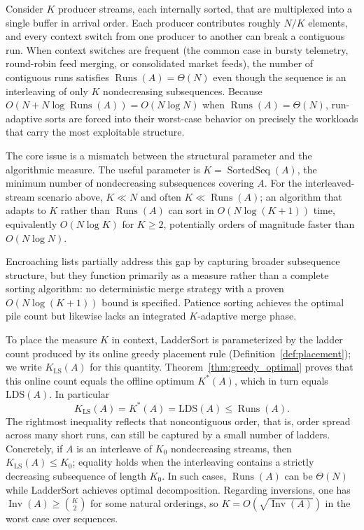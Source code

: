 \documentclass[12pt,a4paper]{article}
\theoremstyle{plain}
\theoremstyle{definition}
\DeclareMathOperator{\Runs}{Runs}
\DeclareMathOperator{\Inv}{Inv}
\DeclareMathOperator{\SortedSeq}{SortedSeq}
\begin{document}
Consider $K$ producer streams, each internally sorted, that are multiplexed
into a single buffer in arrival order.  Each producer contributes roughly
$N/K$ elements, and every context switch from one producer to another can
break a contiguous run.  When context switches are frequent (the common case
in bursty telemetry, round-robin feed merging, or consolidated market
feeds), the number of contiguous runs satisfies
$\Runs(A) = \Theta(N)$ even though the sequence is an interleaving of only
$K$ nondecreasing subsequences.  Because
$O(N + N\log\Runs(A)) = O(N\log N)$ when $\Runs(A)=\Theta(N)$, run-adaptive
sorts are forced into their worst-case behavior on precisely the workloads
that carry the most exploitable structure.

The core issue is a mismatch between the structural parameter and the
algorithmic measure.  The useful parameter is $K = \SortedSeq(A)$, the
minimum number of nondecreasing subsequences covering $A$.  For the
interleaved-stream scenario above, $K \ll N$ and often $K \ll \Runs(A)$;
an algorithm that adapts to $K$ rather than $\Runs(A)$ can sort in
$O(N\log(K+1))$ time, equivalently $O(N\log K)$ for $K \ge 2$, potentially orders of magnitude faster than
$O(N\log N)$.

Encroaching lists \cite{Skiena1988} partially address this gap by
capturing broader subsequence structure, but they function primarily as a
measure rather than a complete sorting algorithm: no deterministic merge
strategy with a proven $O(N\log(K+1))$ bound is specified.  Patience
sorting \cite{AldousDiaconis1999} achieves the optimal pile count but
likewise lacks an integrated $K$-adaptive merge phase.

To place the measure $K$ in context, LadderSort is parameterized by the ladder count produced by its online greedy
placement rule (Definition~\ref{def:placement}); we write
$K_{\mathrm{LS}}(A)$ for this quantity.  Theorem~\ref{thm:greedy_optimal}
proves that this online count equals the offline optimum $K^*(A)$, which in
turn equals $\mathrm{LDS}(A)$.  In particular
\[ K_{\mathrm{LS}}(A) = K^*(A) = \mathrm{LDS}(A) \le \Runs(A). \]
The rightmost inequality reflects that noncontiguous order, that is, order spread
across many short runs, can still be captured by a small number of ladders.
Concretely, if $A$ is an interleave of $K_0$ nondecreasing streams,
then $K_{\mathrm{LS}}(A) \le K_0$; equality holds when the interleaving contains a
strictly decreasing subsequence of length $K_0$.  In such cases, $\Runs(A)$ can be
$\Theta(N)$ while LadderSort achieves optimal decomposition.  Regarding inversions, one has
\(\Inv(A) \ge \binom{K}{2}\) for some natural orderings, so
\(K = O(\sqrt{\Inv(A)})\) in the worst case over sequences.
\end{document}
